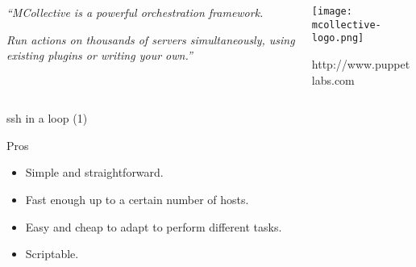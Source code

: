 \documentclass[presentation]{beamer}
\begin{document}
{
\begin{frame}[label=sec-10-1]{}

\begin{columns}
\begin{column}{0.6\textwidth}

\textit{``MCollective is a powerful orchestration framework.}

\textit{Run actions on thousands of servers simultaneously, using existing plugins or writing your own.''}
\end{column}

\begin{column}{0.4\textwidth}

\texttt{[image: mcollective-logo.png]}

\small{http://www.puppetlabs.com}
\end{column}
\end{columns}
\end{frame}
} %


{
\begin{frame}[label=sec-10-2]{ssh in a loop (1)}

\begin{block}{Pros}

\begin{itemize}
\item Simple and straightforward.
\item Fast enough up to a certain number of hosts.
\item Easy and cheap to adapt to perform different tasks.
\item Scriptable.
\end{itemize}
\end{block}
\end{frame}
} %
\end{document}
